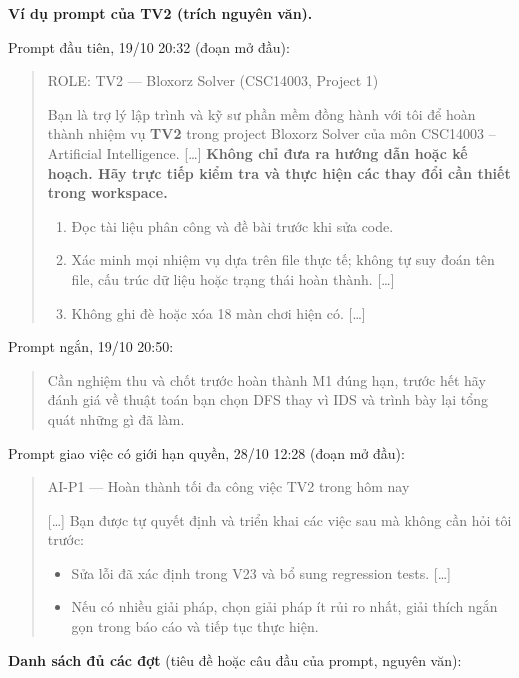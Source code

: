 \textbf{Ví dụ prompt của TV2 (trích nguyên văn).}

Prompt đầu tiên, 19/10 20:32 (đoạn mở đầu):

\begin{quote}
ROLE: TV2 --- Bloxorz Solver (CSC14003, Project 1)

Bạn là trợ lý lập trình và kỹ sư phần mềm đồng hành với tôi để hoàn thành nhiệm vụ \textbf{TV2} trong project Bloxorz Solver của môn CSC14003 -- Artificial Intelligence. {[}\ldots{]} \textbf{Không chỉ đưa ra hướng dẫn hoặc kế hoạch. Hãy trực tiếp kiểm tra và thực hiện các thay đổi cần thiết trong workspace.}

\begin{enumerate}
\def\labelenumi{\arabic{enumi}.}
\tightlist
\item
  Đọc tài liệu phân công và đề bài trước khi sửa code.
\item
  Xác minh mọi nhiệm vụ dựa trên file thực tế; không tự suy đoán tên file, cấu trúc dữ liệu hoặc trạng thái hoàn thành. {[}\ldots{]}
\item
  Không ghi đè hoặc xóa 18 màn chơi hiện có. {[}\ldots{]}
\end{enumerate}
\end{quote}

Prompt ngắn, 19/10 20:50:

\begin{quote}
Cần nghiệm thu và chốt trước hoàn thành M1 đúng hạn, trước hết hãy đánh giá về thuật toán bạn chọn DFS thay vì IDS và trình bày lại tổng quát những gì đã làm.
\end{quote}

Prompt giao việc có giới hạn quyền, 28/10 12:28 (đoạn mở đầu):

\begin{quote}
AI-P1 --- Hoàn thành tối đa công việc TV2 trong hôm nay

{[}\ldots{]} Bạn được tự quyết định và triển khai các việc sau mà không cần hỏi tôi trước:

\begin{itemize}
\tightlist
\item
  Sửa lỗi đã xác định trong V23 và bổ sung regression tests. {[}\ldots{]}
\item
  Nếu có nhiều giải pháp, chọn giải pháp ít rủi ro nhất, giải thích ngắn gọn trong báo cáo và tiếp tục thực hiện.
\end{itemize}
\end{quote}

\textbf{Danh sách đủ các đợt} (tiêu đề hoặc câu đầu của prompt, nguyên văn):


